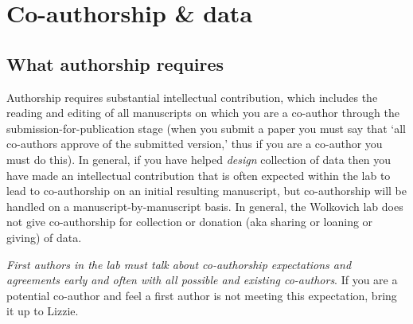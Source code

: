 \documentclass[11pt,a4paper,oneside]{article}
\begin{document}
\section{Co-authorship \& data}
\subsection{What authorship requires}
Authorship requires substantial intellectual contribution, which includes the reading and editing of all manuscripts on which you are a co-author through the submission-for-publication stage (when you submit a paper you must say that `all co-authors approve of the submitted version,' thus if you are a co-author you must do this). In general, if you have helped \emph{design} collection of data then you have made an intellectual contribution that is often expected within the lab to lead to co-authorship on an initial resulting manuscript, but co-authorship will be handled on a manuscript-by-manuscript basis. In general, the Wolkovich lab does not give co-authorship for collection or donation (aka sharing or loaning or giving) of data. 

\emph{First authors in the lab must talk about co-authorship expectations and agreements early and often with all possible and existing co-authors}. If you are a potential co-author and feel a first author is not meeting this expectation, bring it up to Lizzie.
\end{document}
